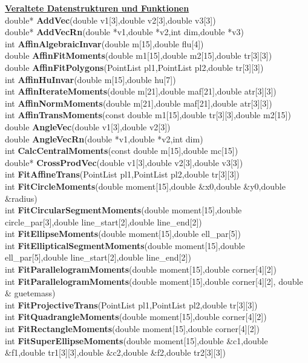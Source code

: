\documentclass[10pt,titlepage]{article}
\newcommand{\subtitle}[1]{{\noindent\bf#1}}
\def\functionlistentry#1#2#3#4#5#6{\noindent #1 {\bf #2}(#3) \dotfill #6\\}
\begin{document}
{{\subtitle{\hyperlink{SECTION:obsolet}{Veraltete Datenstrukturen und Funktionen}}\\
\functionlistentry{double*}{AddVec}{double v1[3],double v2[3],double v3[3]}{1558}{obsolet}{}
\functionlistentry{double*}{AddVecRn}{double *v1,double *v2,int dim,double *v3}{1568}{obsolet}{}
\functionlistentry{int}{AffinAlgebraicInvar}{double m[15],double flu[4]}{1615}{obsolet}{}
\functionlistentry{double}{AffinFitMoments}{double m1[15],double m2[15],double tr[3][3]}{1620}{obsolet}{}
\functionlistentry{double}{AffinFitPolygons}{PointList pl1,PointList pl2,double tr[3][3]}{1621}{obsolet}{}
\functionlistentry{int}{AffinHuInvar}{double m[15],double hu[7]}{1616}{obsolet}{}
\functionlistentry{int}{AffinIterateMoments}{double m[21],double maf[21],double atr[3][3]}{1619}{obsolet}{}
\functionlistentry{int}{AffinNormMoments}{double m[21],double maf[21],double atr[3][3]}{1617}{obsolet}{}
\functionlistentry{int}{AffinTransMoments}{const double m1[15],double tr[3][3],double m2[15]}{1608}{obsolet}{}
\functionlistentry{double}{AngleVec}{double v1[3],double v2[3]}{1565}{obsolet}{}
\functionlistentry{double}{AngleVecRn}{double *v1,double *v2,int dim}{1573}{obsolet}{}
\functionlistentry{int}{CalcCentralMoments}{const double m[15],double mc[15]}{1613}{obsolet}{}
\functionlistentry{double*}{CrossProdVec}{double v1[3],double v2[3],double v3[3]}{1563}{obsolet}{}
\functionlistentry{int}{FitAffineTrans}{PointList pl1,PointList pl2,double tr[3][3]}{1589}{obsolet}{}
\functionlistentry{int}{FitCircleMoments}{double moment[15],double \&x0,double \&y0,double \&radius}{1627}{obsolet}{}
\functionlistentry{int}{FitCircularSegmentMoments}{double moment[15],double circle\_par[3],double line\_start[2],double line\_end[2]}{1628}{obsolet}{}
\functionlistentry{int}{FitEllipseMoments}{double moment[15],double ell\_par[5]}{1629}{obsolet}{}
\functionlistentry{int}{FitEllipticalSegmentMoments}{double moment[15],double ell\_par[5],double line\_start[2],double line\_end[2]}{1630}{obsolet}{}
\functionlistentry{int}{FitParallelogramMoments}{double moment[15],double corner[4][2]}{1624}{obsolet}{}
\functionlistentry{int}{FitParallelogramMoments}{double moment[15],double corner[4][2], double \& guetemass}{1625}{obsolet}{}
\functionlistentry{int}{FitProjectiveTrans}{PointList pl1,PointList pl2,double tr[3][3]}{1590}{obsolet}{}
\functionlistentry{int}{FitQuadrangleMoments}{double moment[15],double corner[4][2]}{1626}{obsolet}{}
\functionlistentry{int}{FitRectangleMoments}{double moment[15],double corner[4][2]}{1623}{obsolet}{}
\functionlistentry{int}{FitSuperEllipseMoments}{double moment[15],double \&c1,double \&f1,double tr1[3][3],double \&c2,double \&f2,double tr2[3][3]}{1631}{obsolet}{}
}}
\end{document}
